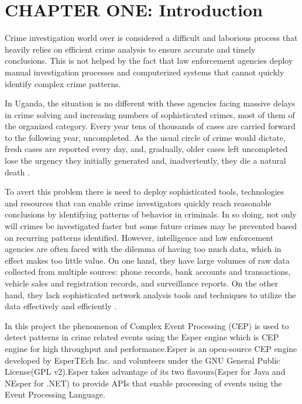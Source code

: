 \section{CHAPTER ONE: Introduction}
\noindent Crime investigation world over is considered a difficult and laborious process that heavily relies on efficient crime analysis to ensure accurate and timely conclusions. This is not helped by the fact that law enforcement agencies deploy manual investigation processes and computerized systems that cannot quickly identify complex crime patterns.

\noindent In Uganda, the situation is no different with these agencies facing massive delays in crime solving and increasing numbers of sophisticated crimes, most of them of the organized category. Every year tens of thousands of cases are carried forward to the following year, uncompleted. As the usual circle of crime would dictate, fresh cases are reported every day, and, gradually, older cases left uncompleted lose the urgency they initially generated and, inadvertently, they die a natural death \cite{eleven}.



\noindent To avert this problem there is need to deploy sophisticated tools, technologies and resources that can enable crime investigators quickly reach reasonable conclusions by identifying patterns of behavior in criminals. In so doing, not only will crimes be investigated faster but some future crimes may be prevented based on recurring patterns identified. However, intelligence and law enforcement agencies are often faced with the dilemma of having too much data, which in effect makes too little value. On one hand, they have large volumes of raw data collected from multiple sources: phone records, bank accounts and transactions, vehicle sales and registration records, and surveillance reports. On the other hand, they lack sophisticated network analysis tools and techniques to utilize the data effectively and efficiently \cite{fifteen}.

\noindent In this project the phenomenon of Complex Event Processing (CEP) is used to detect patterns in crime related events using the Esper engine \cite{twentyfive} which is CEP engine for high throughput and performance.Esper is an open-source CEP engine developed by EsperTEch Inc. and volunteers under the GNU General Public License(GPL v2).Esper takes advantage of its two flavours(Esper for Java and NEsper for .NET) to provide APIs that enable processing of events using the Event Processing Language.


